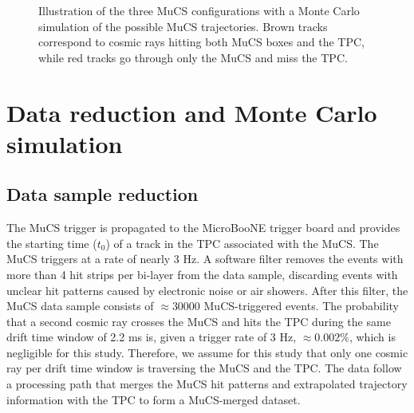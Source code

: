 \documentclass[a4paper,11pt]{article}
\begin{document}
\begin{figure}[htbp]
  \caption{Illustration of the three MuCS configurations with a Monte Carlo simulation of the possible MuCS trajectories. Brown tracks correspond to cosmic rays hitting both MuCS boxes and the TPC, while red tracks go through only the MuCS and miss the TPC.} \label{fig:mucs}
\end{figure}


\section{Data reduction and Monte Carlo simulation}\label{sec:merging}

\subsection{Data sample reduction}\label{sec:data_proc}
The MuCS trigger is propagated to the MicroBooNE trigger board and provides the starting time ($t_0$) of a track in the TPC associated with the MuCS.
The MuCS triggers at a rate of nearly 3 Hz.
A software filter removes the events with more than 4 hit strips per bi-layer from the data sample, discarding events with unclear hit patterns caused by electronic noise or air showers. After this filter, the MuCS data sample consists of $\approx$30000 MuCS-triggered events.
The probability that a second cosmic ray crosses the MuCS and hits the TPC during the same drift time window of 2.2 ms is, given a trigger rate of 3 Hz, $\approx0.002\%$,  which is negligible for this study. Therefore, we assume for this study that only one cosmic ray per drift time window is traversing the MuCS and the TPC.
The data follow a processing path that merges the MuCS hit patterns and extrapolated trajectory information with the TPC to form a MuCS-merged dataset. %

\end{document}
